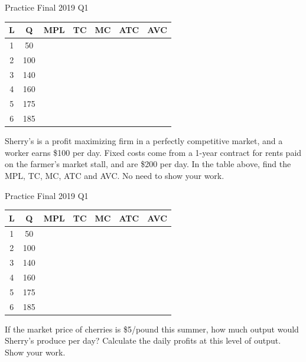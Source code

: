 \documentclass{beamer}
\begin{document}
\begin{frame}{Practice Final 2019 Q1}
    \begin{table}[]
    \begin{tabular}{ccccccc}
    L & Q   & MPL & TC & MC & ATC & AVC \\ \hline
    1 & 50  &     &    &    &     &     \\ \hline
    2 & 100 &     &    &    &     &     \\ \hline
    3 & 140 &     &    &    &     &     \\ \hline
    4 & 160 &     &    &    &     &     \\ \hline
    5 & 175 &     &    &    &     &     \\ \hline
    6 & 185 &     &    &    &     &    
    \end{tabular}
    \end{table}
    Sherry’s is a profit maximizing firm in a perfectly competitive market, and a worker earns \$100 per day.  Fixed costs come from a 1-year contract for rents paid on the farmer’s market stall, and are \$200 per day. In the table above, find the MPL, TC, MC, ATC and AVC.  No need to show your work. 
\end{frame}

\begin{frame}{Practice Final 2019 Q1}
    \begin{table}[]
    \begin{tabular}{ccccccc}
    L & Q   & MPL & TC & MC & ATC & AVC \\ \hline
    1 & 50  &     &    &    &     &     \\ \hline
    2 & 100 &     &    &    &     &     \\ \hline
    3 & 140 &     &    &    &     &     \\ \hline
    4 & 160 &     &    &    &     &     \\ \hline
    5 & 175 &     &    &    &     &     \\ \hline
    6 & 185 &     &    &    &     &    
    \end{tabular}
    \end{table}
    If the market price of cherries is \$5/pound this summer, how much output would Sherry’s produce per day?  Calculate the daily profits at this level of output. Show your work. 
\end{frame}
\end{document}
